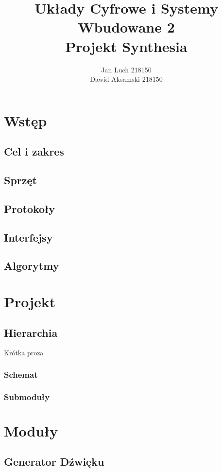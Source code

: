\documentclass[a4paper]{report}
\title{\huge Układy Cyfrowe i Systemy Wbudowane 2\\Projekt Synthesia}
\date{} %
\author{Jan Luch\hspace{42pt} 218150  \\Dawid Aksamski\hspace{5pt} 218150}
\begin{document}
\frenchspacing
{}
\maketitle
\newpage

\tableofcontents
\newpage


\chapter{Wstęp}
	\section{Cel i zakres}
	\section{Sprzęt}
	\section{Protokoły}
	\section{Interfejsy}
	\section{Algorytmy}

\chapter{Projekt}
	\section{Hierarchia}
	Krótka proza
		\subsection{Schemat}
		\subsection{Submoduły}
		
\chapter{Moduły}
	\section{Generator Dźwięku}
\end{document}
